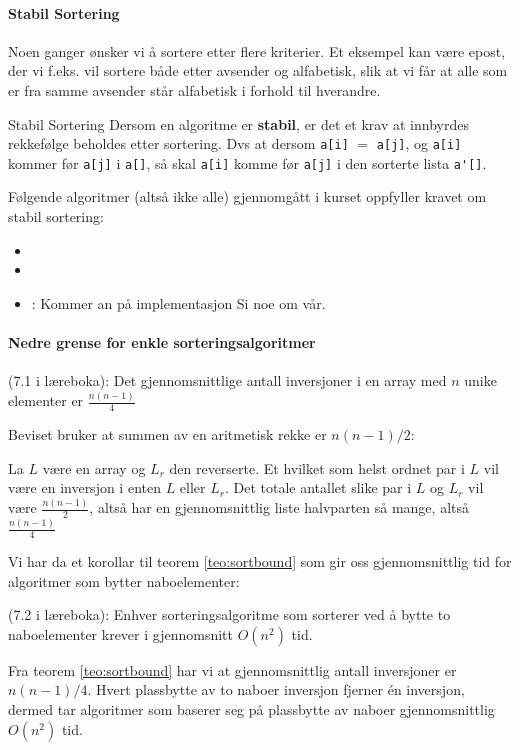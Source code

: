 \paragraph{\color{red}Stabil Sortering}\label{stabil}
Noen ganger ønsker vi å sortere etter flere kriterier. Et eksempel kan være
epost, der vi f.eks. vil sortere både etter avsender og alfabetisk, slik at vi
får at alle som er fra samme avsender står alfabetisk i forhold til hverandre.

\begin{definisjon} Stabil Sortering
  Dersom en algoritme er \textbf{stabil}, er det et krav at innbyrdes rekkefølge beholdes
  etter sortering. Dvs at dersom \verb|a[i]| $ = $ \verb|a[j]|, og \verb|a[i]| kommer før \verb|a[j]| i \verb|a[]|, så skal \verb|a[i]| komme før \verb|a[j]| i den sorterte lista \verb|a'[]|.
\end{definisjon}

Følgende algoritmer (altså ikke alle) gjennomgått i kurset oppfyller kravet om
stabil sortering:
\begin{itemize}
\item {} 
\item {} 
\item {}: Kommer an på implementasjon \color{red}Si noe om vår.
\end{itemize}


\paragraph{Nedre grense for enkle sorteringsalgoritmer}
\begin{teorem} (7.1 i læreboka): Det gjennomsnittlige antall inversjoner i en \label{teo:sortbound}
  array med $n$ unike elementer er $\frac{n(n-1)}{4}$
\end{teorem}
Beviset bruker at summen av en aritmetisk rekke er $ n(n-1)/2 $:
\begin{bevis}
  La $L$ være en array og $L_r$ den reverserte. Et hvilket som helst ordnet par
  i $L$ vil være en inversjon i enten $L$ eller $L_r$. Det totale antallet slike
  par i $L$ og $L_r$ vil være $\frac{n(n-1)}{2}$, altså har en gjennomsnittlig
  liste halvparten så mange, altså $\frac{n(n-1)}{4}$ 
\end{bevis}
Vi har da et korollar til teorem \ref{teo:sortbound} som gir oss gjennomsnittlig tid for algoritmer som bytter naboelementer:
\begin{teorem} (7.2 i læreboka): \label{teo:swapkompl}
  Enhver sorteringsalgoritme som sorterer ved å bytte to naboelementer krever i gjennomsnitt $ O(n^2) $ tid.
\end{teorem}
\begin{bevis}
Fra teorem \ref{teo:sortbound} har vi at gjennomsnittlig antall inversjoner er $ n(n-1)/4 $. Hvert plassbytte av to naboer inversjon fjerner én inversjon, dermed tar algoritmer som baserer seg på plassbytte av naboer gjennomsnittlig $ O(n^2) $ tid.
\end{bevis}




